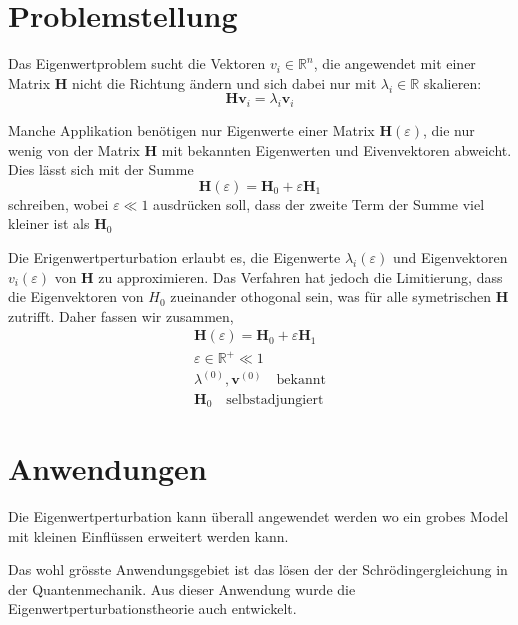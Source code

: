 %
%
%
\section{Problemstellung
\label{ew:section:problemstellung}}

Das Eigenwertproblem sucht die Vektoren $v_i \in \mathbb{R}^{n} $, die angewendet mit einer Matrix $\bm H$ nicht die Richtung ändern und sich dabei nur mit $\lambda_i \in \mathbb{R}$ skalieren:
\begin{equation} 
    \bm H \bm v_i = \lambda_i \bm v_i \label{ew:eq:eig}
\end{equation}

Manche Applikation benötigen nur Eigenwerte einer Matrix $\bm H(\varepsilon)$, die nur wenig von der Matrix $\bm H$ mit bekannten Eigenwerten und Eivenvektoren abweicht.
Dies lässt sich mit der Summe
\begin{equation}
    \bm H(\varepsilon) = \bm H_0 + \varepsilon \bm H_1
\end{equation}
schreiben, wobei $\varepsilon \ll 1 $ ausdrücken soll, dass der zweite Term der Summe viel kleiner ist als $\bm H_0$

Die Erigenwertperturbation erlaubt es, die Eigenwerte $\lambda_i(\varepsilon)$ und Eigenvektoren  $v_i(\varepsilon)$ von $\bm H$ zu approximieren.
Das Verfahren hat jedoch die Limitierung, dass die Eigenvektoren von $H_0$ zueinander othogonal sein, was für alle symetrischen $\bm H$ zutrifft.
Daher fassen wir zusammen,
\begin{gather*}
    \bm H(\varepsilon) = \bm H_0 + \varepsilon \bm H_1 \\
    \varepsilon \in \mathbb{R^+} \ll 1 \\
    \lambda^{(0)}, \bm v^{(0)} \quad \text{bekannt} \\
    \bm H_0 \quad \text{selbstadjungiert}
\end{gather*} %

\section{Anwendungen}

Die Eigenwertperturbation kann überall angewendet werden wo ein grobes Model mit kleinen Einflüssen erweitert werden kann.

Das wohl grösste Anwendungsgebiet ist das lösen der der Schrödingergleichung in der Quantenmechanik.
Aus dieser Anwendung wurde die Eigenwertperturbationstheorie auch entwickelt. %
                
